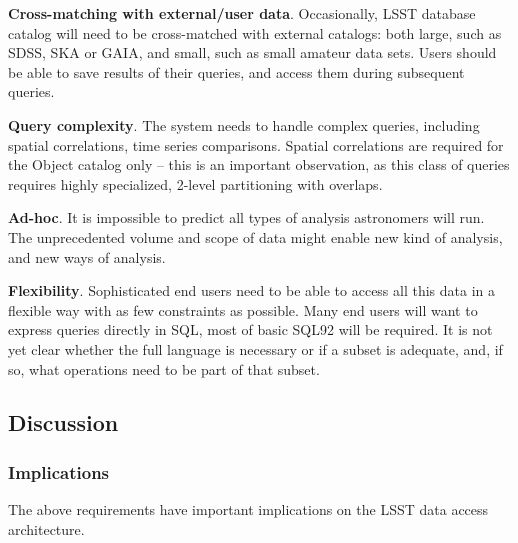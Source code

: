 \documentclass[DM,lsstdraft,toc]{lsstdoc}
\begin{document}
\textbf{Cross-matching with external/user data}. Occasionally, LSST
database catalog will need to be cross-matched with external catalogs:
both large, such as SDSS, SKA or GAIA, and small, such as small amateur
data sets. Users should be able to save results of their queries, and
access them during subsequent queries.

\textbf{Query complexity}. The system needs to handle complex queries,
including spatial correlations, time series comparisons. Spatial
correlations are required for the Object catalog only -- this is an
important observation, as this class of queries requires highly
specialized, 2-level partitioning with overlaps.

\textbf{Ad-hoc}. It is impossible to predict all types of analysis
astronomers will run. The unprecedented volume and scope of data might
enable new kind of analysis, and new ways of analysis.

\textbf{Flexibility}. Sophisticated end users need to be able to access
all this data in a flexible way with as few constraints as possible.
Many end users will want to express queries directly in SQL, most of
basic SQL92 will be required. It is not yet clear whether the full
language is necessary or if a subset is adequate, and, if so, what
operations need to be part of that subset.

\subsection{Discussion}\label{discussion}

\subsubsection{Implications}\label{implications}

The above requirements have important implications on the LSST data
access architecture.
\end{document}
